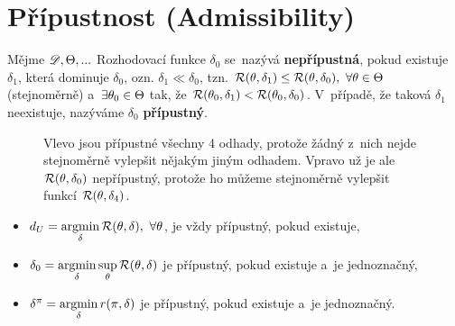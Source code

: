 \section{Přípustnost (Admissibility)}
\begin{define}
	Mějme $\mathscr{D} ,\Theta,...$ Rozhodovací funkce $\delta_0$ se~nazývá \textbf{nepřípustná}, pokud existuje $\delta_1$, která dominuje $\delta_0$, ozn. $\delta_1\ll\delta_0$, tzn. $\mathcal{R}(\theta,\delta_1)\leq\mathcal{R}(\theta,\delta_0),~\forall\theta\in\Theta$ (stejnoměrně) a~$\exists\theta_0\in\Theta$ tak, že $\mathcal{R}(\theta_0,\delta_1)<\mathcal{R}(\theta_0,\delta_0)$. V~případě, že taková $\delta_1$ neexistuje, nazýváme $\delta_0$ \textbf{přípustný}.
	
	\begin{figure}[h]
		\centering
		\caption{Vlevo jsou přípustné všechny 4 odhady, protože žádný z~nich nejde stejnoměrně vylepšit nějakým jiným odhadem. Vpravo už je ale $\mathcal{R}(\theta,\delta_0)$ nepřípustný, protože ho můžeme stejnoměrně vylepšit funkcí $\mathcal{R}(\theta,\delta_4)$.}
		\label{fig:92}
	\end{figure}
	
\end{define}
\begin{theorem}\label{veta_pripustna}
	\begin{itemize}
		\item  $d_U=\mathop{\mathrm{argmin}}\limits_\delta\mathcal{R}(\theta,\delta),~\forall\theta$, je vždy přípustný, pokud existuje, \item  $\delta_0=\mathop{\mathrm{argmin}}\limits_\delta\sup\limits_\theta\mathcal{R}(\theta,\delta)$ je přípustný, pokud existuje a~je jednoznačný, \item  $\delta^\pi=\mathop{\mathrm{argmin}}\limits_\delta r(\pi,\delta)$ je přípustný, pokud existuje a~je jednoznačný.
	\end{itemize}
\end{theorem}

